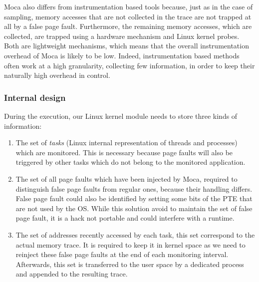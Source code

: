 \gls{Moca} also differs from instrumentation based tools because, just as in the case of sampling, memory accesses that are not collected in the trace are not trapped at all by a false page fault.
Furthermore, the remaining memory accesses, which are collected, are trapped using a hardware mechanism and Linux kernel probes.
Both are lightweight mechanisms, which means that the overall instrumentation overhead of \gls{Moca} is likely to be low.
Indeed, instrumentation based methods often work at a high granularity, collecting few information, in order to keep their naturally high overhead in control.

\subsubsection{Internal design}

During the execution, our \gls{Linux} kernel module needs to store three kinds of information:

\begin{enumerate}
    \item The set of \emph{tasks} (Linux internal representation of threads and processes) which are
monitored.
    This is necessary because page faults will also be triggered by other tasks which do not belong to
    the monitored application.
    \item The set of all page faults which have been injected by \gls{Moca}, required to distinguish false page faults from regular ones, because their handling differs.
        False page fault could also be identified by setting some bits of the \gls{PTE} that are not used by the \gls{OS}.
        While this solution avoid to maintain the set of false page fault, it is a hack not portable and could interfere with a runtime.
    \item The set of addresses recently accessed by each task, this set correspond to the actual memory trace.
        It is required to keep it in kernel space as we need to reinject these false page faults at the end of each monitoring interval.
        Afterwards, this set is transferred to the user space by a dedicated process and appended to the resulting trace.
\end{enumerate}

